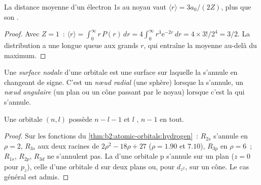 \begin{proposition}\label{prop:b2:atomic-orbitals:mean-radius}
La distance moyenne d'un électron 1s au noyau vaut $\langle r\rangle = 3a_0/(2Z)$,
plus que son .
\end{proposition}

\begin{proof}
Avec $Z = 1$~: $\langle r\rangle = \int_0^\infty r\,P(r)\,dr = 4\int_0^\infty r^3\mathrm e^{-2r}
\,dr = 4 \times 3!/2^4 = 3/2$. La distribution a une longue queue aux grands $r$,
qui entraîne la moyenne au-delà du maximum.
\end{proof}

\begin{definition}[Nœuds]\label{def:b2:atomic-orbitals:node}
Une \emph{surface nodale} d'une orbitale est une surface sur laquelle
la  s'annule en changeant de signe. C'est un \emph{nœud radial}
(une sphère) lorsque la  s'annule, un \emph{nœud
angulaire} (un plan ou un cône passant par le noyau) lorsque c'est la 
qui s'annule.
\end{definition}

\begin{proposition}\label{prop:b2:atomic-orbitals:nodes}
Une orbitale $(n, l)$ possède $n - l - 1$  et $l$ , $n - 1$ en
tout.
\end{proposition}

\begin{proof}
Sur les fonctions du \cref{thm:b2:atomic-orbitals:hydrogen}~: $R_{2s}$ s'annule en
$\rho = 2$, $R_{3s}$ aux deux racines de $2\rho^2 - 18\rho + 27$ ($\rho = 1.90$ et $7.10$),
$R_{3p}$ en $\rho = 6$~; $R_{1s}$, $R_{2p}$, $R_{3d}$ ne s'annulent pas. La 
d'une orbitale p s'annule sur un plan ($z = 0$ pour $p_z$), celle d'une orbitale d sur deux
plans ou, pour $d_{z^2}$, sur un cône. Le cas général est admis.
\end{proof}


